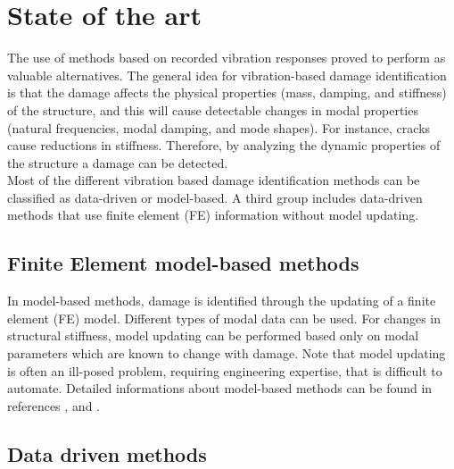 \documentclass[journal]{IEEEtran}
\begin{document}
\section{State of the art}

The use of methods based on recorded vibration responses proved to perform as valuable alternatives.
The general idea for vibration-based damage identification is that the damage affects the physical properties (mass, damping, and stiffness) of the structure, and this will cause detectable changes in modal properties (natural frequencies, modal damping, and mode shapes).
For instance, cracks cause reductions in stiffness. Therefore, by analyzing the dynamic properties of the structure a damage can be detected.
\\

Most of the different vibration based damage identification methods can be classified as data-driven or model-based.
 A third group includes data-driven methods that use finite element (FE) information without model updating.

\subsection{Finite Element model-based methods}

In model-based methods, damage is identified through the updating of a finite element (FE) model.
Different types of modal data can be used. For changes in structural stiffness, model updating can be performed based only on modal parameters which are known to change with damage.
Note that model updating is often an ill-posed problem, requiring engineering expertise, that is difficult to automate.
 Detailed informations about model-based methods can be found in references
\cite{fritzen1998damage},
\cite{simoen2015dealing} and
\cite{teughels2005damage}.


\subsection{Data driven methods}
\end{document}
